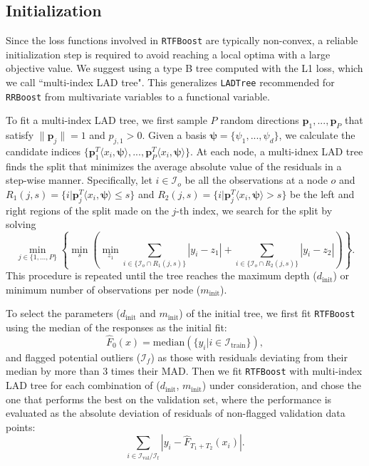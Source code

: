 \documentclass{article}
\begin{document}
\subsection{Initialization}
\label{sec:init}
Since the loss functions involved in \texttt{RTFBoost} are typically non-convex, a reliable initialization step is required to avoid reaching a local optima with a large objective value.  
We suggest using a type B tree computed with the L1 loss, which we call ``multi-index LAD tree".  This generalizes \texttt{LADTree} recommended for \texttt{RRBoost} from multivariate variables to a functional variable. 

To fit a  multi-index  LAD tree, we first sample $P$ random directions ${\mathbf{p}_1,..., \mathbf{p}_P}$ that satisfy 
$\lVert\mathbf{p}_j\rVert = 1$  and $p_{j,1}>0$. Given a basis  $\boldsymbol{\psi} = \{\psi_1, ..., \psi_d\}$, we calculate the candidate indices 
$\{\mathbf{p}_1^T\langle x_i, \boldsymbol{\psi}\rangle,..., \mathbf{p}_P^T\langle x_i, \boldsymbol{\psi}\rangle \}$. At each node, a multi-idnex LAD tree finds the split that minimizes the average absolute value of the residuals in a step-wise manner. Specifically, let $i \in \mathcal{I}_o$ be all the observations at a node $o$ and $R_1(j,s) = \{i| \mathbf{p}_j^T \langle x_i, \boldsymbol{\psi} \rangle \leq s\}$ and $R_2(j,s) = \{i| \mathbf{p}_j^T \langle x_i, \boldsymbol{\psi} \rangle > s\}$  be the left and right regions of the split made on the $j$-th index, we search for the split by solving
$$\min_{j\in \{1,...,P\}} \left \{\min_{s} \left(\min_{z_1} \sum_{i \in \{\mathcal{I}_o \cap R_1(j, s)\}} |y_i - z_1| + \sum_{i \in \{\mathcal{I}_o \cap R_2(j, s)\}}|y_i - z_2| \right) \right \}. $$
This procedure is repeated until the tree reaches the maximum depth ($d_{\text{init}}$) or minimum number of observations per node ($m_{\text{init}}$). 

To select the parameters ($d_{\text{init}}$ and $m_{\text{init}}$) of the initial tree, we first fit \texttt{RTFBoost} using the median of the responses as the initial fit: $$\hat{F}_0(x) = \text{median}( \{y_i| i \in \mathcal{I}_{\text{train}}\}),$$
and flagged potential outliers ($\mathcal{I}_f$) as those with residuals deviating from their median by more than 3 times their MAD. Then we fit \texttt{RTFBoost} with multi-index LAD tree for  each combination of ($d_{\text{init}}$, $m_{\text{init}}$) under consideration,  and chose the one that performs the best on the validation set, where  the performance is evaluated as the absolute deviation of residuals of non-flagged validation data points: 
$$\sum_{i \in \mathcal{I}_{\text{val}}/\mathcal{I}_{\text{f}}} \left|y_i - \hat{F}_{T_1 + T_2}(x_i) \right|.$$
\end{document}
